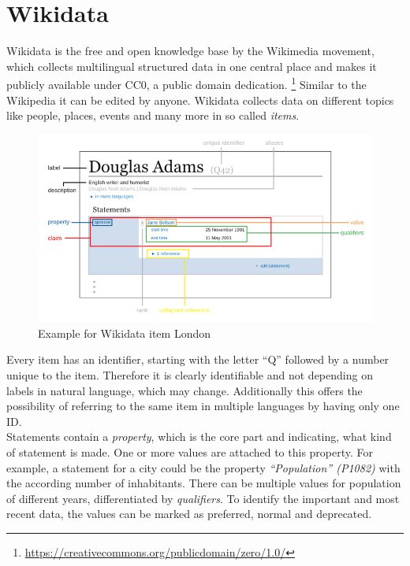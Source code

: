 \section{Wikidata}

Wikidata is the free and open knowledge base by the Wikimedia movement, which collects multilingual structured data in one central place and makes it publicly available under CC0, a public domain dedication. \footnote{\href{https://creativecommons.org/publicdomain/zero/1.0/}{https://creativecommons.org/publicdomain/zero/1.0/}} Similar to the Wikipedia it can be edited by anyone. Wikidata collects data on different topics like people, places, events and many more in so called \textit{items}.
\begin{figure}[H]
	\centering
	\includegraphics[width=\textwidth]{diagrams/Wikidata_statement.png}
	\caption{Example for Wikidata item London}
	\label{diagramWikidataStatement}
\end{figure}
Every item has an identifier, starting with the letter ``Q'' followed by a number unique to the item. Therefore it is clearly identifiable and not depending on labels in natural language, which may change. Additionally this offers the possibility of referring to the same item in multiple languages by having only one ID. \\
Statements contain a \textit{property}, which is the core part and indicating, what kind of statement is made. One or more values are attached to this property. For example, a statement for a city could be the property \textit{``Population'' (P1082)} with the according number of inhabitants. There can be multiple values for population of different years, differentiated by \textit{qualifiers}. To identify the important and most recent data, the values can be marked as preferred, normal and deprecated.\\

